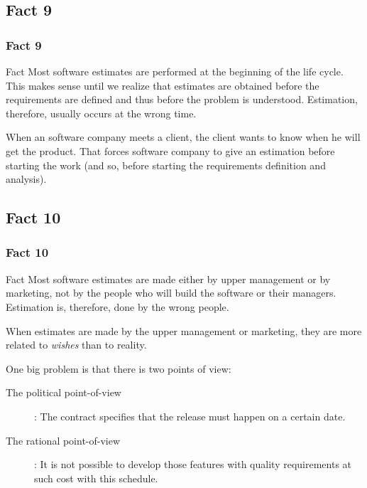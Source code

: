 \documentclass{beamer}
\begin{document}
\subsection{Fact 9}
\begin{frame}
    \frametitle{Fact 9}
    \begin{block}{Fact}
    Most software estimates are performed at the beginning of the life cycle.
    This makes sense until we realize that estimates are obtained before the
    requirements are defined and thus before the problem is understood.
    Estimation, therefore, usually occurs at the wrong time.
    \end{block}
    \pause

    When an software company meets a client, the client wants to know when he
    will get the product. That forces software company to give an estimation
    before starting the work (and so, before starting the requirements
    definition and analysis).
\end{frame}

\subsection{Fact 10}
\begin{frame}
    \frametitle{Fact 10}
    \begin{block}{Fact}
    Most software estimates are made either by upper management or by marketing,
    not by the people who will build the software or their managers. Estimation
    is, therefore, done by the wrong people.
    \end{block}
    \pause

    When estimates are made by the upper management or marketing, they are more
    related to \textit{wishes} than to reality. \newline
    \pause

    One big problem is that there is two points of view:

    \begin{description}
        \item[The political point-of-view]: The contract specifies that the release
        must happen on a certain date.
        \pause
        \item[The rational point-of-view]: It is not possible to develop
        those features with quality requirements at such cost with this schedule.
    \end{description}
\end{frame}
\end{document}
